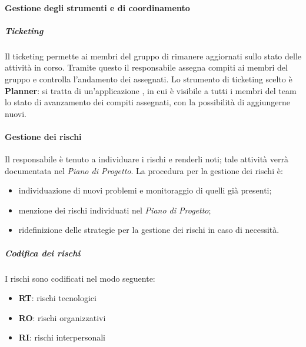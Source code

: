 \paragraph{Gestione degli strumenti e di coordinamento}
\subparagraph{Ticketing}
Il ticketing permette ai membri del gruppo di rimanere aggiornati sullo stato delle attività in corso. Tramite questo il responsabile assegna compiti ai membri del gruppo e controlla l'andamento dei  assegnati. Lo strumento di ticketing scelto è \textbf{Planner}: si tratta di un'applicazione , in cui è visibile a tutti i membri del team lo stato di avanzamento dei compiti assegnati, con la possibilità di aggiungerne nuovi. 

\paragraph{Gestione dei rischi}
Il responsabile è tenuto a individuare i rischi e renderli noti; tale attività verrà documentata nel \textit{Piano di Progetto}. La procedura per la gestione dei rischi è: 
\begin{itemize}
\item individuazione di nuovi problemi e monitoraggio di quelli già presenti;
\item menzione dei rischi individuati nel \textit{Piano di Progetto}; 
\item ridefinizione delle strategie per la gestione dei rischi in caso di necessità.
\end{itemize}

\subparagraph{Codifica dei rischi}
I rischi sono codificati nel modo seguente: 
\begin{itemize}
\item  \textbf{RT}: rischi tecnologici 
\item \textbf{RO}: rischi organizzativi
\item   \textbf{RI}: rischi interpersonali
\end{itemize}

